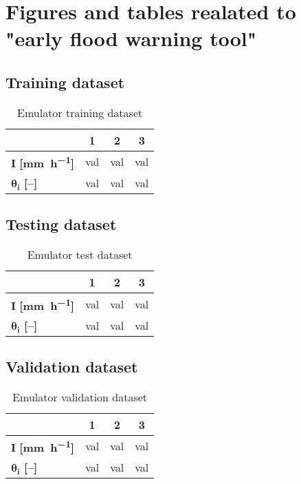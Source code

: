 
\chapter{Figures and tables realated to "early flood warning tool"}
\label{AppendixB}

\section{Training dataset}
\label{sec:training_dataset}

\begin{table}[htpb]
  \centering
  \caption{Emulator training dataset}
  \label{tab:training_dataset}
  \begin{tabular}{lccc}
    \toprule
     & \textbf{1} & \textbf{2} & \textbf{3}\\
    \midrule
    $\bm{I}$ \textbf{[\si{\milli\meter\per\hour}]} & val & val & val \\
    $\bm{\theta_i}$ \textbf{[--]} & val & val & val \\
    \bottomrule
  \end{tabular}
\end{table}

\section{Testing dataset}
\label{sec:testing_dataset}

\begin{table}[htpb]
  \centering
  \caption{Emulator test dataset}
  \label{tab:test_dataset}
  \begin{tabular}{lccc}
    \toprule
     & \textbf{1} & \textbf{2} & \textbf{3}\\
    \midrule
    $\bm{I}$ \textbf{[\si{\milli\meter\per\hour}]} & val & val & val \\
    $\bm{\theta_i}$ \textbf{[--]} & val & val & val \\
    \bottomrule
  \end{tabular}
\end{table}

\section{Validation dataset}
\label{sec:validation_dataset}

\begin{table}[htpb]
  \centering
  \caption{Emulator validation dataset}
  \label{tab:validation_dataset}
  \begin{tabular}{lccc}
    \toprule
     & \textbf{1} & \textbf{2} & \textbf{3}\\
    \midrule
    $\bm{I}$ \textbf{[\si{\milli\meter\per\hour}]} & val & val & val \\
    $\bm{\theta_i}$ \textbf{[--]} & val & val & val \\
    \bottomrule
  \end{tabular}
\end{table}


